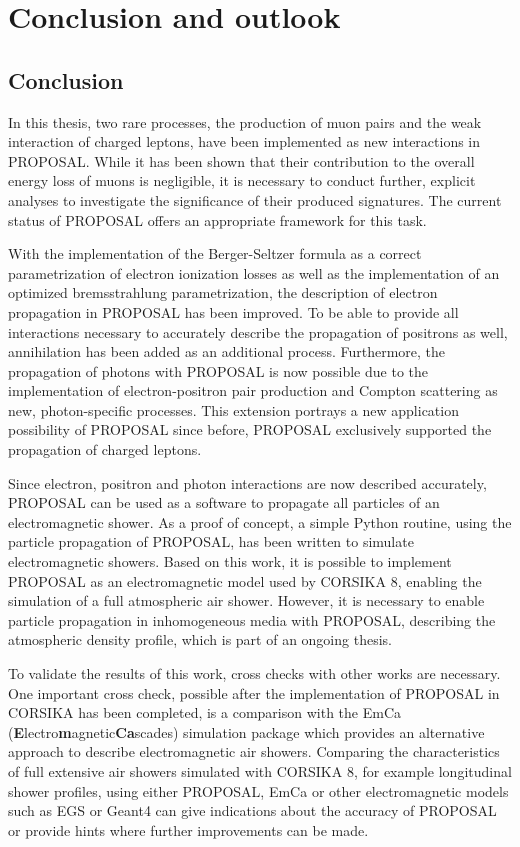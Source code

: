 \chapter{Conclusion and outlook} 

\section{Conclusion}

In this thesis, two rare processes, the production of muon pairs and the weak interaction of charged leptons, have been implemented as new interactions in PROPOSAL.
While it has been shown that their contribution to the overall energy loss of muons is negligible, it is necessary to conduct further, explicit analyses to investigate the significance of their produced signatures.
The current status of PROPOSAL offers an appropriate framework for this task.

With the implementation of the Berger-Seltzer formula as a correct parametrization of electron ionization losses as well as the implementation of an optimized bremsstrahlung parametrization, the description of electron propagation in PROPOSAL has been improved.
To be able to provide all interactions necessary to accurately describe the propagation of positrons as well, annihilation has been added as an additional process.
Furthermore, the propagation of photons with PROPOSAL is now possible due to the implementation of electron-positron pair production and Compton scattering as new, photon-specific processes.
This extension portrays a new application possibility of PROPOSAL since before, PROPOSAL exclusively supported the propagation of charged leptons.

Since electron, positron and photon interactions are now described accurately, PROPOSAL can be used as a software to propagate all particles of an electromagnetic shower.
As a proof of concept, a simple Python routine, using the particle propagation of PROPOSAL, has been written to simulate electromagnetic showers.
Based on this work, it is possible to implement PROPOSAL as an electromagnetic model used by CORSIKA 8, enabling the simulation of a full atmospheric air shower.
However, it is necessary to enable particle propagation in inhomogeneous media with PROPOSAL, describing the atmospheric density profile, which is part of an ongoing thesis.

To validate the results of this work, cross checks with other works are necessary.
One important cross check, possible after the implementation of PROPOSAL in CORSIKA has been completed, is a comparison with the EmCa (\textbf{E}lectro\textbf{m}agnetic\-\textbf{Ca}scades) simulation package \cite{meighenberger2019emca} which provides an alternative approach to describe electromagnetic air showers.
Comparing the characteristics of full extensive air showers simulated with CORSIKA 8, for example longitudinal shower profiles, using either PROPOSAL, EmCa or other electromagnetic models such as EGS or Geant4 can give indications about the accuracy of PROPOSAL or provide hints where further improvements can be made.

